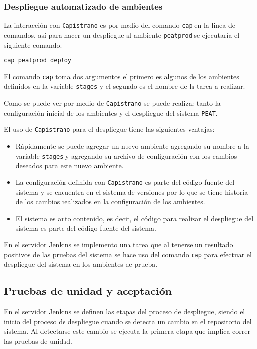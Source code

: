 \subsubsection{Despliegue automatizado de ambientes}

La interacción con \texttt{Capistrano} es por medio del comando \texttt{cap}
en la linea de comandos, así para hacer un despliegue al ambiente \texttt{peatprod}
se ejecutaría el siguiente comando.

\begin{verbatim}
cap peatprod deploy
\end{verbatim}

El comando \texttt{cap} toma dos argumentos el primero es algunos de los
ambientes definidos en la variable \texttt{stages} y el segundo es el nombre
de la tarea a realizar.

Como se puede ver por medio de \texttt{Capistrano} se puede realizar tanto
la configuración inicial de los ambientes y el despliegue del sistema \texttt{PEAT}.

El uso de \texttt{Capistrano} para el despliegue tiene las siguientes ventajas:
\begin{itemize}
\item Rápidamente se puede agregar un nuevo ambiente agregando su nombre a la
  variable \texttt{stages} y agregando su archivo de configuración con los
  cambios deseados para este nuevo ambiente.
\item La configuración definida con \texttt{Capistrano} es parte del código fuente
  del sistema y se encuentra en el sistema de versiones por lo que se tiene historia
  de los cambios realizados en la configuración de los ambientes.
\item El sistema es auto contenido, es decir, el código para realizar el despliegue
  del sistema es parte del código fuente del sistema.
\end{itemize}

En el servidor Jenkins se implemento una tarea que al tenerse un resultado
positivos de las pruebas del sistema se hace uso del comando \texttt{cap}
para efectuar el despliegue del sistema en los ambientes de prueba.

\subsection{Pruebas de unidad y aceptación}

En el servidor Jenkins se definen las etapas del proceso de despliegue, siendo
el inicio del proceso de despliegue cuando se detecta un cambio en el repositorio
del sistema. Al detectarse este cambio se ejecuta la primera etapa que implica
correr las pruebas de unidad.

